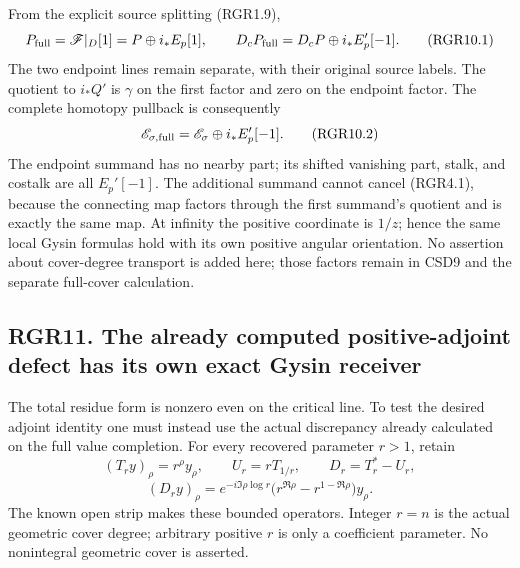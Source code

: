 From the explicit source splitting (RGR1.9), \[
 P_{\rm full}=\mathscr F|_D[1]=P\oplus i_*E_p[1],
 \qquad D_cP_{\rm full}=D_cP\oplus i_*E_p'[-1].
 \tag{RGR10.1}
\] The two endpoint lines remain separate, with their original source
labels. The quotient to \(i_*Q'\) is \(\gamma\) on the first factor and
zero on the endpoint factor. The complete homotopy pullback is
consequently \[
 \mathscr E_{\sigma,\rm full}
 =\mathscr E_\sigma\oplus i_*E_p'[-1].
 \tag{RGR10.2}
\] The endpoint summand has no nearby part; its shifted vanishing part,
stalk, and costalk are all \(E_p'[-1]\). The additional summand cannot
cancel (RGR4.1), because the connecting map factors through the first
summand's quotient and is exactly the same map. At infinity the positive
coordinate is \(1/z\); hence the same local Gysin formulas hold with its
own positive angular orientation. No assertion about cover-degree
transport is added here; those factors remain in CSD9 and the separate
full-cover calculation.

\subsection{RGR11. The already computed positive-adjoint defect has its
own exact Gysin
receiver}\label{rgr11.-the-already-computed-positive-adjoint-defect-has-its-own-exact-gysin-receiver}

The total residue form is nonzero even on the critical line. To test the
desired adjoint identity one must instead use the actual discrepancy
already calculated on the full value completion. For every recovered
parameter \(r>1\), retain \[
 (T_r y)_\rho=r^\rho y_\rho,\qquad U_r=rT_{1/r},\qquad
 D_r=T_r^*-U_r,
\] \[
 (D_r y)_\rho=
 e^{-i\Im\rho\log r}\bigl(r^{\Re\rho}-r^{1-\Re\rho}\bigr)y_\rho.
 \tag{RGR11.1}
\] The known open strip makes these bounded operators. Integer \(r=n\)
is the actual geometric cover degree; arbitrary positive \(r\) is only a
coefficient parameter. No nonintegral geometric cover is asserted.

